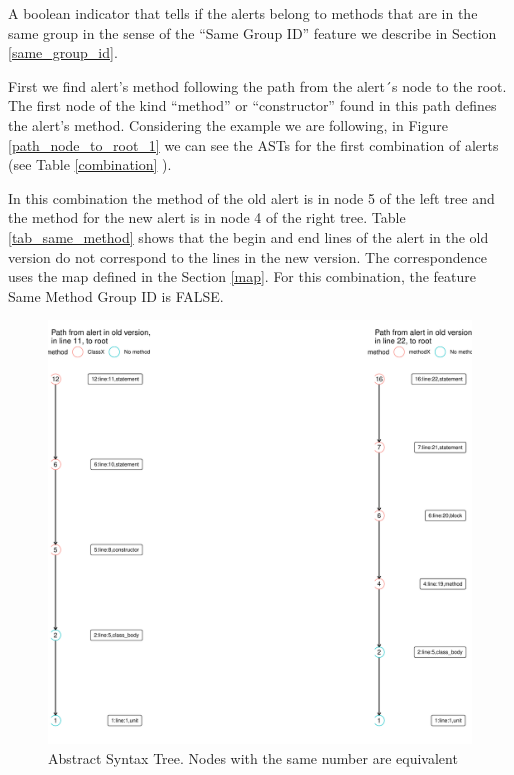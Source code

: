 \documentclass[
]{article}
\begin{document}
A boolean indicator that tells if the alerts belong to methods that are
in the same group in the sense of the ``Same Group ID'' feature we
describe in Section \ref{same_group_id}.

First we find alert's method following the path from the alert´s node to
the root. The first node of the kind ``method'' or ``constructor'' found
in this path defines the alert's method. Considering the example we are
following, in Figure \ref{path_node_to_root_1} we can see the ASTs for
the first combination of alerts (see Table \ref{combination} ).

In this combination the method of the old alert is in node 5 of the left
tree and the method for the new alert is in node 4 of the right tree.
Table \ref{tab_same_method} shows that the begin and end lines of the
alert in the old version do not correspond to the lines in the new
version. The correspondence uses the map defined in the Section
\ref{map}. For this combination, the feature Same Method Group ID is
FALSE.

\small

\begin{figure}[H]
\includegraphics[width=1\linewidth]{report_files/figure-latex/unnamed-chunk-8-1} \caption{Abstract Syntax Tree. Nodes with the same number are equivalent \label{path_node_to_root_1}}\label{fig:unnamed-chunk-8}
\end{figure}
\end{document}
